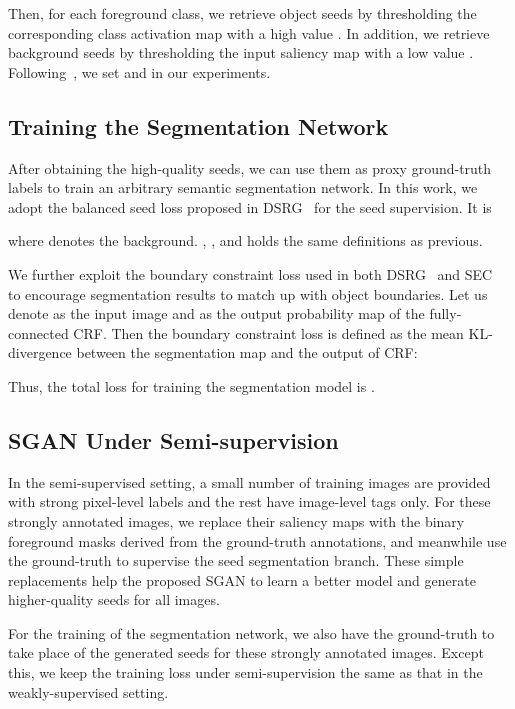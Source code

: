 \documentclass[journal]{IEEEtran}
\begin{document}
Then, for each foreground class, we retrieve object seeds by thresholding the corresponding class activation map with a high value . In addition, we retrieve background seeds by thresholding the input saliency map with a low value . Following~\cite{kolesnikov2016seed,huang2018weakly,wei2018revisiting}, we set  and  in our experiments.








\subsection{Training the Segmentation Network} 
After obtaining the high-quality seeds, we can use them as proxy ground-truth labels to train an arbitrary semantic segmentation network. In this work, we adopt the balanced seed loss  proposed in DSRG~\cite{huang2018weakly} for the seed supervision. It is

where  denotes the background. , , and  holds the same definitions as previous. 

We further exploit the boundary constraint loss used in both DSRG~\cite{huang2018weakly} and SEC~\cite{kolesnikov2016seed} to encourage segmentation results to match up with object boundaries. Let us denote  as the input image and  as the output probability map of the fully-connected CRF. Then the boundary constraint loss is defined as the mean KL-divergence between the segmentation map and the output of CRF:

Thus, the total loss for training the segmentation model is . 

\subsection{SGAN Under Semi-supervision}
\label{sec:semi-sgan}
In the semi-supervised setting, a small number of training images are provided with strong pixel-level labels and the rest have image-level tags only. For these strongly annotated images, we replace their saliency maps with the binary foreground masks derived from the ground-truth annotations, and meanwhile use the ground-truth to supervise the seed segmentation branch. These simple replacements help the proposed SGAN to learn a better model and generate higher-quality seeds for all images. 

For the training of the segmentation network, we also have the ground-truth to take place of the generated seeds for these strongly annotated images. Except this, we keep the training loss under semi-supervision the same as that in the weakly-supervised setting. 
\end{document}
